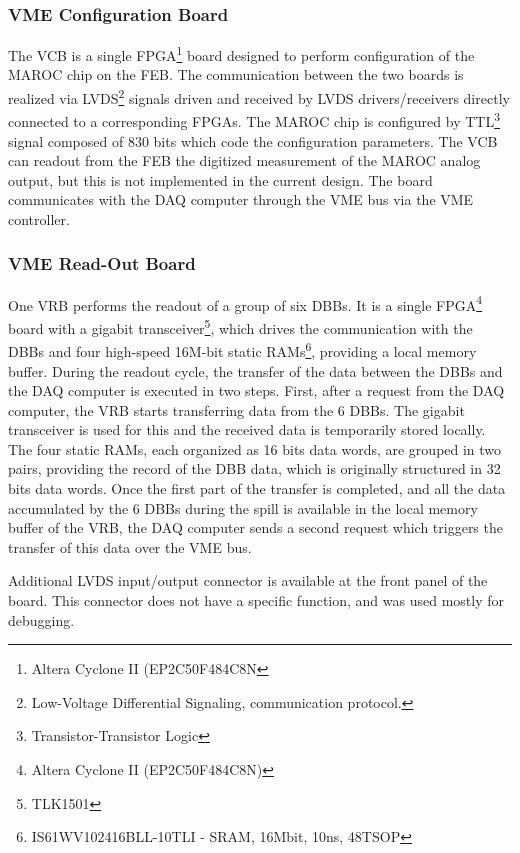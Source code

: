 \documentclass[a4paper,11pt]{article}
\begin{document}
\subsubsection{VME Configuration Board}
The VCB is a single FPGA\footnote{Altera Cyclone II (EP2C50F484C8N} board designed to perform configuration of the MAROC chip on the FEB. The
communication between the two boards is realized via LVDS\footnote{Low-Voltage Differential Signaling, communication protocol.} signals driven and
received by LVDS drivers/receivers directly connected to a corresponding FPGAs. The MAROC chip is configured by TTL\footnote{Transistor-Transistor
Logic} signal composed of 830 bits which code the configuration parameters. The VCB can readout from the FEB the digitized measurement of the
MAROC analog output, but this is not implemented in the current design. The board communicates with the DAQ computer through the VME bus via the
VME controller. 

\subsubsection{VME Read-Out Board}\label{electronics:subsec:vme_readout_board}

One VRB performs the readout of a group of six DBBs. It is a single FPGA\footnote{Altera Cyclone II (EP2C50F484C8N)} board with a gigabit 
transceiver\footnote{TLK1501}, which drives the communication with the DBBs and four high-speed 16M-bit static RAMs\footnote{IS61WV102416BLL-10TLI
- SRAM, 16Mbit, 10ns, 48TSOP}, providing a local memory buffer. During the readout cycle, the transfer of the data between the DBBs and the DAQ computer
is executed in two steps. First, after a request from the DAQ computer, the VRB starts transferring data from the 6 DBBs. The gigabit transceiver is used
for this and the received data is temporarily stored locally. The four static RAMs, each organized as 16 bits data words, are grouped in two pairs,
providing the record of the DBB data, which is originally structured in 32 bits data words. Once the first part of the transfer is completed, and all
the data accumulated by the 6 DBBs during the spill is available in the local memory buffer of the VRB, the DAQ computer sends a second request which
triggers the transfer of this data over the VME bus.

Additional LVDS input/output connector is available at the front panel of the board. This connector does not have a specific function, and was used
mostly for debugging.
\end{document}
